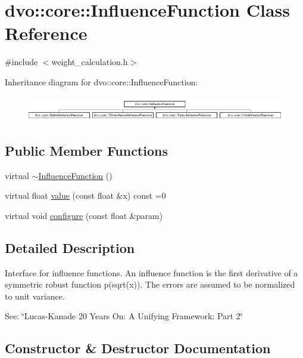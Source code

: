 \hypertarget{classdvo_1_1core_1_1_influence_function}{}\section{dvo\+:\+:core\+:\+:Influence\+Function Class Reference}
\label{classdvo_1_1core_1_1_influence_function}


{\ttfamily \#include $<$weight\+\_\+calculation.\+h$>$}

Inheritance diagram for dvo\+:\+:core\+:\+:Influence\+Function\+:\begin{figure}[H]
\begin{center}
\leavevmode
\includegraphics[height=1.120000cm]{classdvo_1_1core_1_1_influence_function}
\end{center}
\end{figure}
\subsection*{Public Member Functions}
\begin{DoxyCompactItemize}
\item 
virtual \mbox{\hyperlink{classdvo_1_1core_1_1_influence_function_afb3069251ce14c9213db1672c774e082}{$\sim$\+Influence\+Function}} ()
\item 
virtual float \mbox{\hyperlink{classdvo_1_1core_1_1_influence_function_a158082c763fa9de460e75a285bb91f1e}{value}} (const float \&x) const =0
\item 
virtual void \mbox{\hyperlink{classdvo_1_1core_1_1_influence_function_a4773b03ca609bc5d8391d09d92ab34ad}{configure}} (const float \&param)
\end{DoxyCompactItemize}


\subsection{Detailed Description}
Interface for influence functions. An influence function is the first derivative of a symmetric robust function p(sqrt(x)). The errors are assumed to be normalized to unit variance.

See\+: \char`\"{}\+Lucas-\/\+Kanade 20 Years On\+: A Unifying Framework\+: Part 2\char`\"{} 

\subsection{Constructor \& Destructor Documentation}
\mbox{\label{classdvo_1_1core_1_1_influence_function_afb3069251ce14c9213db1672c774e082}} 
